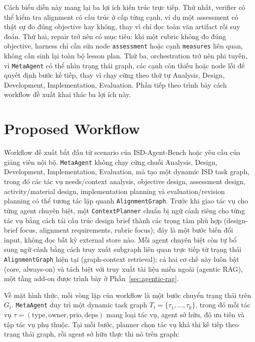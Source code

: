 \documentclass[../main.tex]{subfiles}
\begin{document}
Cách biểu diễn này mang lại ba lợi ích kiến trúc trực tiếp. Thứ nhất, verifier có thể kiểm tra alignment có cấu trúc ở cấp từng cạnh, ví dụ một assessment có thật sự đo đúng objective hay không, thay vì chỉ đọc toàn văn artifact rồi suy đoán. Thứ hai, repair trở nên có mục tiêu: khi một rubric không đo đúng objective, harness chỉ cần sửa node \texttt{assessment} hoặc cạnh \texttt{measures} liên quan, không cần sinh lại toàn bộ lesson plan. Thứ ba, orchestration trở nên phi tuyến, vì \texttt{MetaAgent} có thể nhìn trạng thái graph, các cạnh còn thiếu hoặc node lỗi để quyết định bước kế tiếp, thay vì chạy cứng theo thứ tự Analysis, Design, Development, Implementation, Evaluation. Phần tiếp theo trình bày cách workflow đề xuất khai thác ba lợi ích này.

\section{Proposed Workflow}

Workflow đề xuất bắt đầu từ scenario của ISD-Agent-Bench hoặc yêu cầu của giảng viên nội bộ. \texttt{MetaAgent} không chạy cứng chuỗi Analysis, Design, Development, Implementation, Evaluation, mà tạo một dynamic ISD task graph, trong đó các tác vụ needs/context analysis, objective design, assessment design, activity/material design, implementation planning và evaluation/revision planning có thể tương tác lặp quanh \texttt{AlignmentGraph}. Trước khi giao tác vụ cho từng agent chuyên biệt, một \texttt{ContextPlanner} chuẩn bị ngữ cảnh riêng cho từng tác vụ bằng cách tái cấu trúc design brief thành các trọng tâm phù hợp (design-brief focus, alignment requirements, rubric focus); đây là một bước biến đổi input, không đọc bất kỳ external store nào. Mỗi agent chuyên biệt còn tự bổ sung ngữ cảnh bằng cách truy xuất subgraph liên quan trực tiếp từ trạng thái \texttt{AlignmentGraph} hiện tại (graph-context retrieval); cả hai cơ chế này luôn bật (core, always-on) và tách biệt với truy xuất tài liệu miền ngoài (agentic RAG), một tầng add-on được trình bày ở Phần~\ref{sec:agentic-rag}.

Về mặt hình thức, mỗi vòng lặp của workflow là một bước chuyển trạng thái trên $G_t$. \texttt{MetaAgent} duy trì một dynamic task graph $T_t = \{\tau_1, \dots, \tau_k\}$, trong đó mỗi tác vụ $\tau = (\mathrm{type}, \mathrm{owner}, \mathrm{prio}, \mathrm{deps})$ mang loại tác vụ, agent sở hữu, độ ưu tiên và tập tác vụ phụ thuộc. Tại mỗi bước, planner chọn tác vụ khả thi kế tiếp theo trạng thái graph, rồi agent sở hữu thực thi nó trên graph:
\end{document}
